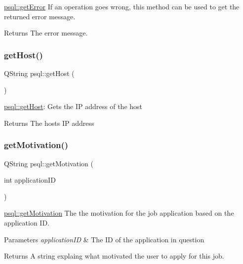 \mbox{\hyperlink{classpsql_a5f51e254b67ff932f287df2184ccc043}{psql\+::get\+Error}} If an operation goes wrong, this method can be used to get the returned error message. 

\begin{DoxyReturn}{Returns}
The error message. 
\end{DoxyReturn}
\mbox{\label{classpsql_a95d06ee661db0b9cf72605b983b04613}} 
\subsubsection{\texorpdfstring{get\+Host()}{getHost()}}
{\footnotesize\ttfamily Q\+String psql\+::get\+Host (\begin{DoxyParamCaption}{ }\end{DoxyParamCaption})}



\mbox{\hyperlink{classpsql_a95d06ee661db0b9cf72605b983b04613}{psql\+::get\+Host}}\+: Gets the IP address of the host 

\begin{DoxyReturn}{Returns}
The host\textquotesingle{}s IP address 
\end{DoxyReturn}
\mbox{\label{classpsql_aca1b2273937491e113089c1547caf49b}} 
\subsubsection{\texorpdfstring{get\+Motivation()}{getMotivation()}}
{\footnotesize\ttfamily Q\+String psql\+::get\+Motivation (\begin{DoxyParamCaption}\item[{int}]{application\+ID }\end{DoxyParamCaption})}



\mbox{\hyperlink{classpsql_aca1b2273937491e113089c1547caf49b}{psql\+::get\+Motivation}} The the motivation for the job application based on the application ID. 


\begin{DoxyParams}{Parameters}
{\em application\+ID} & The ID of the application in question \\
\hline
\end{DoxyParams}
\begin{DoxyReturn}{Returns}
A string explaing what motivated the user to apply for this job. 
\end{DoxyReturn}
\mbox{\label{classpsql_a817e5a88f877cac6f843c1e743aec096}} 

